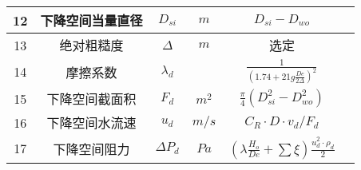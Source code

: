 \begin{table}[H]
{\begin{tabular}{|c|c|c|c|c|c|}
            12   & 下降空间当量直径 & $ D_{si} $     & $ m $      & $ D_{si} - D_{wo} $                                                   &      \\ \hline
            13   & 绝对粗糙度       & $ \Delta $     & $ m $      & 选定                                                                  &      \\ \hline
            14   & 摩擦系数         & $ \lambda_d $  &            & $ \frac{1}{(1.74+21g \frac{De}{2 \Delta})^2} $                        &      \\ \hline
            15   & 下降空间截面积   & $ F_d $        & $ m^2 $    & $ \frac{\pi}{4}(D_{si}^{2}-D_{wo}^{2}) $                              &      \\ \hline
            16   & 下降空间水流速   & $ u_d $        & $ m/s $    & $ C_R \cdot D \cdot v_d / F_d $                                       &      \\ \hline
            17   & 下降空间阻力     & $ \Delta P_d $ & $ Pa $     & $ (\lambda \frac{H_o}{De}+\sum \xi)\frac{u_{d}^{2} \cdot \rho_d}{2} $ &      \\ \hline
        \end{tabular}
    }
\end{table}

\newpage
